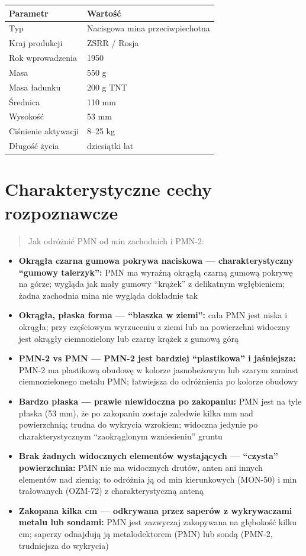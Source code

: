 \documentclass[12pt,openany,oneside]{book}
\providecommand{\tightlist}{%
  \setlength{\itemsep}{0pt}\setlength{\parskip}{0pt}}
\begin{document}
\begin{longtable}[]{@{}ll@{}}
\toprule\noalign{}
Parametr & Wartość \\
\midrule\noalign{}
\endhead
\bottomrule\noalign{}
\endlastfoot
Typ & Nacisgowa mina przeciwpiechotna \\
Kraj produkcji & ZSRR / Rosja \\
Rok wprowadzenia & 1950 \\
Masa & 550 g \\
Masa ładunku & 200 g TNT \\
Średnica & 110 mm \\
Wysokość & 53 mm \\
Ciśnienie aktywacji & 8--25 kg \\
Długość życia & dziesiątki lat \\
\end{longtable}

\section{Charakterystyczne cechy
rozpoznawcze}\label{charakterystyczne-cechy-rozpoznawcze-107}

\begin{quote}
Jak odróżnić PMN od min zachodnich i PMN-2:
\end{quote}

\begin{itemize}
\tightlist
\item
  \textbf{Okrągła czarna gumowa pokrywa naciskowa --- charakterystyczny
  ``gumowy talerzyk'':} PMN ma wyraźną okrągłą czarną gumową pokrywę na
  górze; wygląda jak mały gumowy ``krążek'' z delikatnym wgłębieniem;
  żadna zachodnia mina nie wygląda dokładnie tak
\item
  \textbf{Okrągła, płaska forma --- ``blaszka w ziemi'':} cała PMN jest
  niska i okrągła; przy częściowym wyrzuceniu z ziemi lub na powierzchni
  widoczny jest okrągły ciemnozielony lub czarny krążek z gumową górą
\item
  \textbf{PMN-2 vs PMN --- PMN-2 jest bardziej ``plastikowa'' i
  jaśniejsza:} PMN-2 ma plastikową obudowę w kolorze jasnobeżowym lub
  szarym zamiast ciemnozielonego metalu PMN; łatwiejsza do odróżnienia
  po kolorze obudowy
\item
  \textbf{Bardzo płaska --- prawie niewidoczna po zakopaniu:} PMN jest
  na tyle płaska (53 mm), że po zakopaniu zostaje zaledwie kilka mm nad
  powierzchnią; trudna do wykrycia wzrokiem; widoczna jedynie po
  charakterystycznym ``zaokrąglonym wzniesieniu'' gruntu
\item
  \textbf{Brak żadnych widocznych elementów wystających --- ``czysta''
  powierzchnia:} PMN nie ma widocznych drutów, anten ani innych
  elementów nad ziemią; to odróżnia ją od min kierunkowych (MON-50) i
  min trałowanych (OZM-72) z charakterystyczną anteną
\item
  \textbf{Zakopana kilka cm --- odkrywana przez saperów z wykrywaczami
  metalu lub sondami:} PMN jest zazwyczaj zakopywana na głębokość kilku
  cm; saperzy odnajdują ją metalodektorem (PMN) lub sondą (PMN-2,
  trudniejsza do wykrycia)
\end{itemize}
\end{document}
